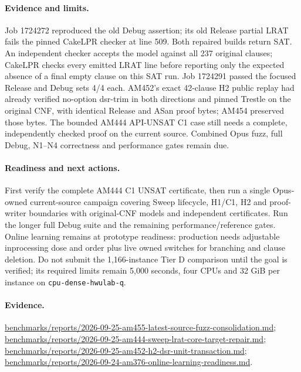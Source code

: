 \documentclass[11pt]{article}
\begin{document}
\paragraph{Evidence and limits.}
Job 1724272 reproduced the old Debug assertion; its old Release partial LRAT
fails the pinned CakeLPR checker at line 509. Both repaired builds return SAT.
An independent checker accepts the model against all 237 original clauses;
CakeLPR checks every emitted LRAT line before reporting only the expected
absence of a final empty clause on this SAT run. Job 1724291 passed the focused
Release and Debug sets 4/4 each. AM452's exact 42-clause H2 public replay had
already verified no-option dsr-trim in both directions and pinned Trestle on
the original CNF, with identical Release and ASan proof bytes; AM454 preserved
those bytes. The bounded AM444 API-UNSAT C1 case still needs a complete,
independently checked proof on the current source. Combined Opus fuzz,
full Debug, N1--N4 correctness and performance gates remain due.

\paragraph{Readiness and next actions.}
First verify the complete AM444 C1 UNSAT certificate, then run a single
Opus-owned current-source campaign covering Sweep lifecycle, H1/C1, H2 and
proof-writer boundaries with original-CNF models and independent certificates.
Run the longer full Debug suite and the remaining performance/reference gates.
Online learning remains at prototype readiness: production needs adjustable
inprocessing dose and order plus live owned switches for branching and clause
deletion. Do not submit the 1,166-instance Tier D comparison until the goal is
verified; its required limits remain 5,000 seconds, four CPUs and 32 GiB per
instance on \texttt{cpu-dense-hwulab-q}.

\paragraph{Evidence.}
\url{benchmarks/reports/2026-09-25-am455-latest-source-fuzz-consolidation.md};
\url{benchmarks/reports/2026-09-25-am444-sweep-lrat-core-target-repair.md};
\url{benchmarks/reports/2026-09-25-am452-h2-dsr-unit-transaction.md};
\url{benchmarks/reports/2026-09-24-am376-online-learning-readiness.md}.
\end{document}
